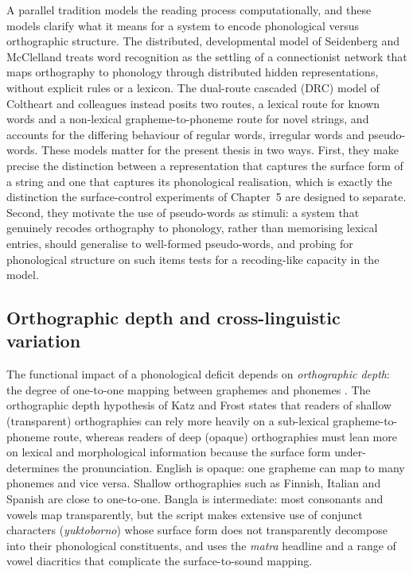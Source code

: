 A parallel tradition models the reading process computationally, and these models clarify what it means for a system to encode phonological versus orthographic structure. The distributed, developmental model of Seidenberg and McClelland \cite{seidenberg1989distributed} treats word recognition as the settling of a connectionist network that maps orthography to phonology through distributed hidden representations, without explicit rules or a lexicon. The dual-route cascaded (DRC) model of Coltheart and colleagues \cite{coltheart2001drc} instead posits two routes, a lexical route for known words and a non-lexical grapheme-to-phoneme route for novel strings, and accounts for the differing behaviour of regular words, irregular words and pseudo-words. These models matter for the present thesis in two ways. First, they make precise the distinction between a representation that captures the surface form of a string and one that captures its phonological realisation, which is exactly the distinction the surface-control experiments of Chapter~5 are designed to separate. Second, they motivate the use of pseudo-words as stimuli: a system that genuinely recodes orthography to phonology, rather than memorising lexical entries, should generalise to well-formed pseudo-words, and probing for phonological structure on such items tests for a recoding-like capacity in the model.

\subsection{Orthographic depth and cross-linguistic variation}

The functional impact of a phonological deficit depends on \emph{orthographic depth}: the degree of one-to-one mapping between graphemes and phonemes \cite{ziegler2005reading,katz1992reading}. The orthographic depth hypothesis of Katz and Frost \cite{katz1992reading} states that readers of shallow (transparent) orthographies can rely more heavily on a sub-lexical grapheme-to-phoneme route, whereas readers of deep (opaque) orthographies must lean more on lexical and morphological information because the surface form under-determines the pronunciation. English is opaque: one grapheme can map to many phonemes and vice versa. Shallow orthographies such as Finnish, Italian and Spanish are close to one-to-one. Bangla is intermediate: most consonants and vowels map transparently, but the script makes extensive use of conjunct characters (\textit{yuktoborno}) whose surface form does not transparently decompose into their phonological constituents, and uses the \textit{matra} headline and a range of vowel diacritics that complicate the surface-to-sound mapping.

